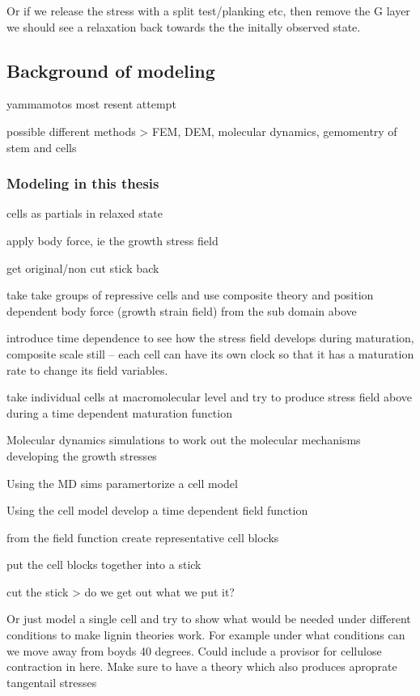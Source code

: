\documentclass{article}
\begin{document}
Or if we release the stress with a split test/planking etc, then remove the G
layer we should see a relaxation back towards the the initally observed
state.

\subsection{Background of modeling}

yammamotos most resent attempt

possible different methods > FEM, DEM, molecular dynamics, gemomentry of stem
and cells

\subsubsection{Modeling in this thesis}
cells as partials in relaxed state

apply body force, ie the growth stress field

get original/non cut stick back

take take groups of repressive cells and use composite theory and position dependent body force
(growth strain field) from the sub domain above

introduce time dependence to see how the stress field develops during
maturation, composite scale still -- each cell can have its own clock so that it
has a maturation rate to change its field variables.

take individual cells at macromolecular level and try to produce stress field
above during a time dependent maturation function

Molecular dynamics simulations to work out the molecular mechanisms developing the growth stresses

Using the MD sims paramertorize a cell model

Using the cell model develop a time dependent field function

from the field function create representative cell blocks

put the cell blocks together into a stick

cut the stick > do we get out what we put it?


Or just model a single cell and try to show what would be needed under different
conditions to make lignin theories work. For example under what conditions can
we move away from boyds 40 degrees. Could include a provisor for cellulose
contraction in here. Make sure to have a theory which also produces aproprate
tangentail stresses
\end{document}
